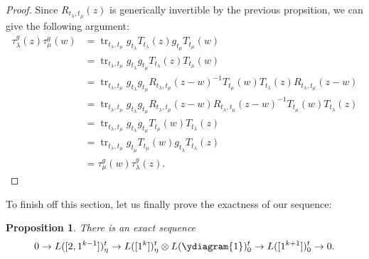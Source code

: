 \documentclass[11pt]{report}
\newtheorem{prop}[theorem]{Proposition}
\theoremstyle{definition}
\theoremstyle{remark}
\theoremstyle{remark}
\begin{document}
\begin{proof}
Since $R_{t_\lambda,t_\mu}(z)$ is generically invertible by the previous propsition, we can give the following argument:
\begin{align*}
\tau_\lambda^g(z) \tau_\mu^g(w)
&= \operatorname{tr}_{t_\lambda,t_\mu} g_{t_\lambda} T_{t_\lambda}(z) g_{t_\mu} T_{t_\mu}(w) \\
&= \operatorname{tr}_{t_\lambda,t_\mu} g_{t_\lambda} g_{t_\mu} T_{t_\lambda}(z) T_{t_\mu}(w) \\
&= \operatorname{tr}_{t_\lambda,t_\mu} g_{t_\lambda} g_{t_\mu} R_{t_\lambda,t_\mu}(z-w)^{-1} T_{t_\mu}(w) T_{t_\lambda}(z) R_{t_\lambda,t_\mu}(z-w) \\
&= \operatorname{tr}_{t_\lambda,t_\mu} g_{t_\lambda} g_{t_\mu} R_{t_\lambda,t_\mu}(z-w) R_{t_\lambda,t_\mu}(z-w)^{-1} T_{t_\mu}(w) T_{t_\lambda}(z) \\
&= \operatorname{tr}_{t_\lambda,t_\mu} g_{t_\lambda} g_{t_\mu} T_{t_\mu}(w) T_{t_\lambda}(z) \\
&= \operatorname{tr}_{t_\lambda,t_\mu} g_{t_\mu} T_{t_\mu}(w) g_{t_\lambda} T_{t_\lambda}(z) \\
&= \tau_\mu^g(w) \tau_\lambda^g(z).
\end{align*}
\end{proof}

To finish off this section, let us finally prove the exactness of our sequence:

\begin{prop}
There is an exact sequence
\begin{equation*}
0 \to L([2,1^{k-1}])_\eta^t \to L([1^k])_\eta^t \otimes L(\ydiagram{1})_0^t \to L([1^{k+1}])_0^t \to 0.
\end{equation*}
\end{prop}
\end{document}
